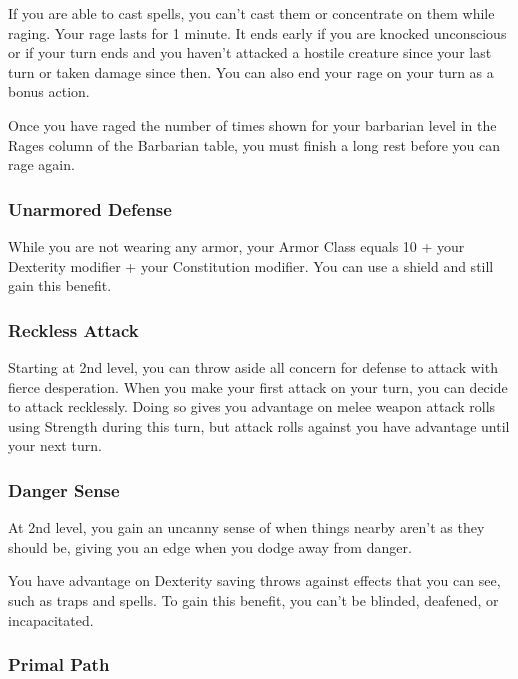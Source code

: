 \documentclass[
]{article}
\begin{document}
If you are able to cast spells, you can't cast them or concentrate on
them while raging. Your rage lasts for 1 minute. It ends early if you
are knocked unconscious or if your turn ends and you haven't attacked a
hostile creature since your last turn or taken damage since then. You
can also end your rage on your turn as a bonus action.

Once you have raged the number of times shown for your barbarian level
in the Rages column of the Barbarian table, you must finish a long rest
before you can rage again.

\hypertarget{unarmored-defense}{%
\subsubsection{Unarmored Defense}\label{unarmored-defense}}

While you are not wearing any armor, your Armor Class equals 10 + your
Dexterity modifier + your Constitution modifier. You can use a shield
and still gain this benefit.

\hypertarget{reckless-attack}{%
\subsubsection{Reckless Attack}\label{reckless-attack}}

Starting at 2nd level, you can throw aside all concern for defense to
attack with fierce desperation. When you make your first attack on your
turn, you can decide to attack recklessly. Doing so gives you advantage
on melee weapon attack rolls using Strength during this turn, but attack
rolls against you have advantage until your next turn.

\hypertarget{danger-sense}{%
\subsubsection{Danger Sense}\label{danger-sense}}

At 2nd level, you gain an uncanny sense of when things nearby aren't as
they should be, giving you an edge when you dodge away from danger.

You have advantage on Dexterity saving throws against effects that you
can see, such as traps and spells. To gain this benefit, you can't be
blinded, deafened, or incapacitated.

\hypertarget{primal-path}{%
\subsubsection{Primal Path}\label{primal-path}}
\end{document}
